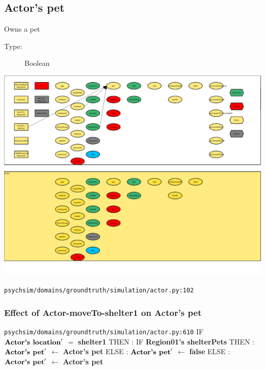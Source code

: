 \documentclass{article}%
\begin{document}
\subsection{Actor's pet}%
\label{subsec:Actor's pet}%
Owns a pet%
\begin{description}%
\item[Type:]%
Boolean%
\end{description}%
\includegraphics[width=\textwidth]{images/petOfActor.png}%
\begin{flushleft}%
\verb|psychsim/domains/groundtruth/simulation/actor.py:102|%
\end{flushleft}%
\subsubsection{Effect of Actor{-}moveTo{-}shelter1 on Actor's pet}%
\label{ssubsec:Effect of Actor{-}moveTo{-}shelter1 on Actor's pet}%
\begin{flushleft}%
\verb|psychsim/domains/groundtruth/simulation/actor.py:610|%
\linebreak%
IF %
$\mbox{\textbf{Actor's location}} '$%
$=$%
\textbf{shelter1}%
\linebreak%
\hspace*{2em}%
THEN %
: %
IF %
\textbf{Region01's shelterPets}%
\linebreak%
\hspace*{4em}%
THEN %
: %
$\mbox{\textbf{Actor's pet}} '$%
$\leftarrow$%
\textbf{Actor's pet}%
\linebreak%
\hspace*{4em}%
ELSE %
: %
$\mbox{\textbf{Actor's pet}} '$%
$\leftarrow$%
\textbf{false}%
\linebreak%
\hspace*{2em}%
ELSE %
: %
$\mbox{\textbf{Actor's pet}} '$%
$\leftarrow$%
\textbf{Actor's pet}%
\end{flushleft}
\end{document}
